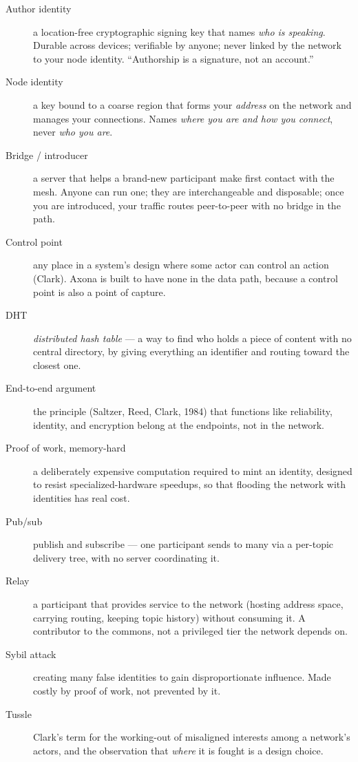 \documentclass[nobib,justified]{tufte-handout}
\begin{document}
\begin{description}
\item[Author identity] a location-free cryptographic signing key that names
\emph{who is speaking}. Durable across devices; verifiable by anyone; never linked
by the network to your node identity. ``Authorship is a signature, not an
account.''
\item[Node identity] a key bound to a coarse region that forms your \emph{address}
on the network and manages your connections. Names \emph{where you are and how you
connect}, never \emph{who you are}.
\item[Bridge / introducer] a server that helps a brand-new participant make first
contact with the mesh. Anyone can run one; they are interchangeable and disposable;
once you are introduced, your traffic routes peer-to-peer with no bridge in the
path.
\item[Control point] any place in a system's design where some actor can control an
action (Clark). Axona is built to have none in the data path, because a control
point is also a point of capture.
\item[DHT] \emph{distributed hash table} --- a way to find who holds a piece of
content with no central directory, by giving everything an identifier and routing
toward the closest one.
\item[End-to-end argument] the principle (Saltzer, Reed, Clark, 1984) that
functions like reliability, identity, and encryption belong at the endpoints, not
in the network.
\item[Proof of work, memory-hard] a deliberately expensive computation required to
mint an identity, designed to resist specialized-hardware speedups, so that
flooding the network with identities has real cost.
\item[Pub/sub] publish and subscribe --- one participant sends to many via a
per-topic delivery tree, with no server coordinating it.
\item[Relay] a participant that provides service to the network (hosting address
space, carrying routing, keeping topic history) without consuming it. A contributor
to the commons, not a privileged tier the network depends on.
\item[Sybil attack] creating many false identities to gain disproportionate
influence. Made costly by proof of work, not prevented by it.
\item[Tussle] Clark's term for the working-out of misaligned interests among a
network's actors, and the observation that \emph{where} it is fought is a design
choice.
\end{description}
\end{document}
